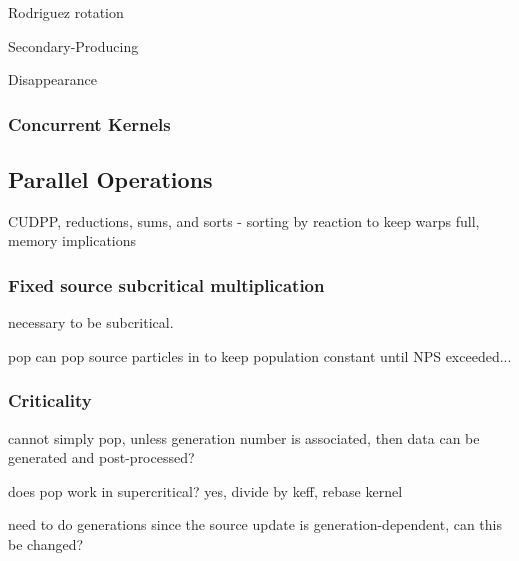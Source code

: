 Rodriguez rotation

Secondary-Producing

Disappearance

\subsubsection{Concurrent Kernels}


\subsection{Parallel Operations}

CUDPP, reductions, sums, and sorts - sorting by reaction to keep warps full, memory implications

\subsubsection{Fixed source subcritical multiplication}

necessary to be subcritical.

pop can pop source particles in to keep population constant until NPS exceeded...

\subsubsection{Criticality}

cannot simply pop, unless generation number is associated, then data can be generated and post-processed?

does pop work in supercritical? yes, divide by keff, rebase kernel

need to do generations since the source update is generation-dependent, can this be changed?





